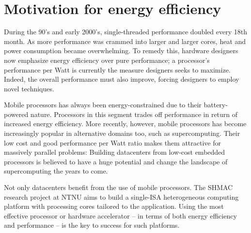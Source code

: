 \section{Motivation for energy efficiency}


During the 90's and early 2000's, single-threaded performance doubled every 18th
month. As more performance was crammed into larger and larger cores, heat and
power consumption became overwhelming. To remedy this, hardware designers now
emphasize energy efficiency over pure performance; a processor's performance per
Watt is currently the measure designers seeks to maximize. Indeed, the overall
performance must also improve, forcing designers to employ novel techniques.


Mobile processors has always been energy-constrained due to their
battery-powered nature. Processors in this segment trades off performance in
return of increased energy efficiency. More recently, however, mobile processors
has become increasingly popular in alternative domains too, such as
supercomputing.  Their low cost and good performance per Watt ratio makes them
attractive for massively parallel problems: Building datacenters from low-cost
embedded processors is believed to have a huge potential and change the
landscape of supercomputing the years to come.


Not only datacenters benefit from the use of mobile processors. The SHMAC
research project at NTNU aims to build a single-ISA heterogeneous computing
platform with processing cores tailored to the application. Using the most
effective processor or hardware accelerator -- in terms of both energy efficiency
and performance -- is the key to success for such platforms.



